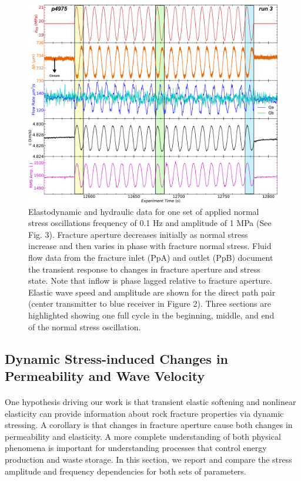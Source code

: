 \documentclass[letterpaper,10pt]{article}
\begin{document}
\begin{figure}[ht]
	\centering
	\includegraphics[width=0.9\columnwidth]{NS_p4975_run3}
	\caption[]{Elastodynamic and hydraulic data for one set of applied normal stress oscillations frequency of 0.1 Hz and amplitude of 1 MPa (See Fig. 3). Fracture aperture decreases initially as normal stress increase and then varies in phase with fracture normal stress. Fluid flow data from the fracture inlet (PpA) and outlet (PpB) document the transient response to changes in fracture aperture and stress state. Note that inflow is phase lagged relative to fracture aperture. Elastic wave speed and amplitude are shown for the direct path pair (center transmitter to blue receiver in Figure 2). Three sections are highlighted showing one full cycle in the beginning, middle, and end of the normal stress oscillation. }
	\label{fig:NS_p4975_run3b_01Hz}
\end{figure}

\clearpage


\subsection{Dynamic Stress-induced Changes in Permeability and Wave Velocity}
\paragraph{}
One hypothesis driving our work is that transient elastic softening and nonlinear elasticity can provide information about rock fracture properties via dynamic stressing. A corollary is that changes in fracture aperture cause both changes in permeability and elasticity. A more complete understanding of both physical phenomena is important for understanding processes that control energy production and waste storage. In this section, we report and compare the stress amplitude and frequency dependencies for both sets of parameters. 
\end{document}
